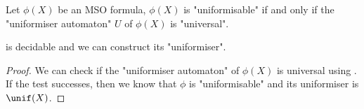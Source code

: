 \documentclass[twoside]{article}
\begin{document}
\begin{theorem}
	Let $\phi(X)$ be an MSO formula, $\phi(X)$ is "uniformisable" if and only if the "uniformiser automaton" $U$ of $\phi(X)$ is "universal".
\end{theorem}

\begin{coro}
	 is decidable and we can construct its "uniformiser". 
\end{coro}

\begin{proof}
	We can check if the "uniformiser automaton" of $\phi(X)$ is universal using . If the test successes,
	then we know that $\phi$ is "uniformisable" and its uniformiser is $\unif(X)$.
\end{proof}



\end{document}
